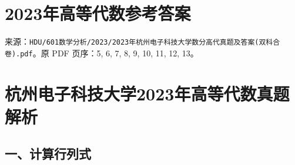 \documentclass[11pt,fontset=fandol]{ctexart}
\begin{document}
\section{2023年高等代数参考答案}\label{ux5e74ux9ad8ux7b49ux4ee3ux6570ux53c2ux8003ux7b54ux6848}

来源：\texttt{HDU/601数学分析/2023/2023年杭州电子科技大学数分高代真题及答案(双科合卷).pdf}。原
PDF 页序：5, 6, 7, 8, 9, 10, 11, 12, 13。

\section{杭州电子科技大学2023年高等代数真题解析}\label{ux676dux5ddeux7535ux5b50ux79d1ux6280ux5927ux5b662023ux5e74ux9ad8ux7b49ux4ee3ux6570ux771fux9898ux89e3ux6790}

\subsection{一、计算行列式}\label{ux4e00ux8ba1ux7b97ux884cux5217ux5f0f}
\end{document}

